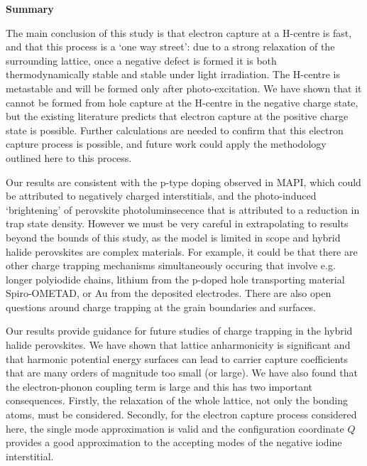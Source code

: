 \textbf{Summary}

The main conclusion of this study is that electron capture at a H-centre is fast, and that this process is a `one way street': due to a strong relaxation of the surrounding lattice, once a negative defect is formed it is both thermodynamically stable and stable under light irradiation.
The H-centre is metastable and will be formed only after photo-excitation. We have shown that it cannot be formed from hole capture at the H-centre in the negative charge state, but the existing literature predicts that electron capture at the positive charge state is possible.\autocite{Meggiolaro2018} Further calculations are needed to confirm that this electron capture process is possible, and future work could apply the methodology outlined here to this process. 

Our results are consistent with the p-type doping observed in MAPI, which could be attributed to negatively charged interstitials,\autocite{Li2018} and the photo-induced `brightening' of perovskite photoluminsecence that is attributed to a reduction in trap state density.\autocite{dequilettes2016}
However we must be very careful in extrapolating to results beyond the bounds of this study,
as the model is limited in scope and hybrid halide perovskites are complex materials. 
For example, it could be that there are other charge trapping mechanisms simultaneously occuring that involve e.g. longer polyiodide chains, lithium from the p-doped hole transporting material Spiro-OMETAD, or Au from the deposited electrodes. There are also open questions around charge trapping at the grain boundaries and surfaces.\autocite{Chen2019}

Our results provide guidance for future studies of charge trapping in the hybrid halide perovskites.
We have shown that lattice anharmonicity is significant and that harmonic potential energy surfaces can lead to carrier capture coefficients that are many orders of magnitude too small (or large).
We have also found that the electron-phonon coupling term is large and this has two important consequences. Firstly, the relaxation of the whole lattice, not only the bonding atoms, must be considered.
Secondly, for the electron capture process considered here, the single mode approximation is valid and the configuration coordinate $Q$ provides a good approximation to the accepting modes of the negative iodine interstitial.

